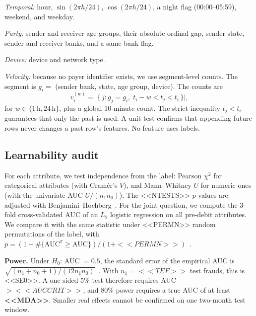 \documentclass[conference]{IEEEtran}
\begin{document}
\emph{Temporal:} hour, $\sin(2\pi h/24)$, $\cos(2\pi h/24)$, a night flag (00:00--05:59), weekend, and weekday.

\emph{Party:} sender and receiver age groups, their absolute ordinal gap, sender state, sender and receiver banks, and a same-bank flag.

\emph{Device:} device and network type.

\emph{Velocity:} because no payer identifier exists, we use segment-level counts. The segment is $g_i = $ (sender bank, state, age group, device). The counts are
\begin{equation}
v_i^{(w)} = \big|\{\, j : g_j = g_i,\; t_i - w < t_j < t_i \,\}\big|,
\end{equation}
for $w\in\{1\,\text{h}, 24\,\text{h}\}$, plus a global 10-minute count. The strict inequality $t_j<t_i$ guarantees that only the past is used. A unit test confirms that appending future rows never changes a past row's features. No feature uses labels.

\subsection{Learnability audit}\label{sec:auditmethod}
For each attribute, we test independence from the label: Pearson $\chi^2$ for categorical attributes (with Cram\'er's $V$), and Mann--Whitney $U$ for numeric ones (with the univariate AUC $U/(n_1n_0)$). The <<NTESTS>> $p$-values are adjusted with Benjamini--Hochberg~\cite{bh1995}. For the joint question, we compute the 3-fold cross-validated AUC of an $L_2$ logistic regression on all pre-debit attributes. We compare it with the same statistic under <<PERMN>> random permutations of the label, with $p = (1+\#\{\text{AUC}^{\pi}\ge \text{AUC}\})/(1+<<PERMN>>)$~\cite{ojala2010}.

\textbf{Power.} Under $H_0$: AUC $=0.5$, the standard error of the empirical AUC is $\sqrt{(n_1+n_0+1)/(12 n_1 n_0)}$~\cite{hanley1982}. With $n_1=<<TEF>>$ test frauds, this is <<SE0>>. A one-sided 5\% test therefore requires AUC $><<AUCCRIT>>$, and 80\% power requires a true AUC of at least \textbf{<<MDA>>}. Smaller real effects cannot be confirmed on one two-month test window.
\end{document}
